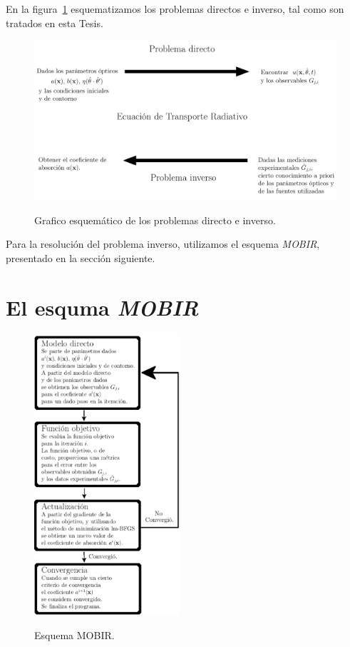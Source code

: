 En la figura~\ref{fig:esquemainv} 
esquematizamos los problemas directos e inverso, tal como son 
tratados en esta Tesis. 

\begin{figure}[h!]
\centering
  \includegraphics[width=\linewidth]{figuras/inv.pdf}\\
  \caption{
Grafico esquemático de los problemas directo e inverso.}
 \label{fig:esquemainv}
\end{figure}
Para la resolución del problema inverso, utilizamos el esquema \textit{MOBIR}, 
presentado en la sección siguiente. 

\pagebreak

\section{El esquma \textit{MOBIR}}

\begin{figure}
  \includegraphics[width=0.48\textwidth]{figuras/mobir.eps}\\
  \caption{Esquema  MOBIR.}
 \label{fig:mobir}
\end{figure}

